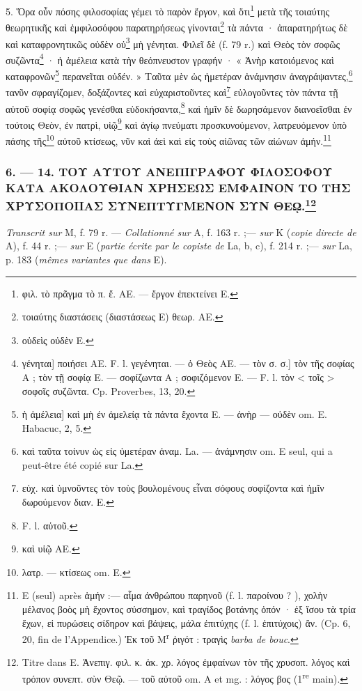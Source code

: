 \documentclass[a4paper, 11pt, oneside, polutonikogreek, french]{article}
\begin{document}
5. Ὅρα οὖν πόσης φιλοσοφίας γέμει τὸ παρὸν ἔργον, καὶ ὅτι\footnote{φιλ. τὸ πρᾶγμα τὸ π. ἔ. AE. --- ἔργον ἐπεκτείνει E.} μετὰ τῆς τοιαύτης θεωρητικῆς καὶ ἐμφιλοσόφου παρατηρήσεως γίνονται\footnote{τοιαύτης διαστάσεις (διαστάσεως E) θεωρ. AE.} τὰ πάντα · ἀπαρατηρήτως δὲ καὶ καταφρονητικῶς οὐδὲν οὐ\footnote{οὐδεὶς οὐδὲν E.} μὴ γένηται. Φιλεῖ δὲ (f. 79 r.) καὶ Θεὸς τὸν σοφῶς συζῶντα\footnote{γένηται] ποιήσει AE. F. l. γεγένηται. --- ὁ Θεὸς AE. --- τὸν σ. σ.] τὸν τῆς σοφίας A ; τὸν τῇ σοφίᾳ E. --- σοφίζωντα A ; σοφιζόμενον E. --- F. l. τὸν < τοῖς > σοφοῖς συζῶντα. Cp. Proverbes, 13, 20.} · ἡ ἀμέλεια κατὰ τὴν θεόπνευστον γραφήν · « Ἀνὴρ κατοιόμενος καὶ καταφρονῶν\footnote{ἡ ἀμέλεια] καὶ μὴ ἐν ἀμελείᾳ τὰ πάντα ἔχοντα E. --- ἀνὴρ --- οὐδὲν om. E. Habacuc, 2, 5.} περανεῖται οὐδέν. » Ταῦτα μὲν ὡς ἡμετέραν ἀνάμνησιν ἀναγράψαντες,\footnote{καὶ ταῦτα τοίνυν ὡς εἰς ὑμετέραν ἀναμ. La. --- ἀνάμνησιν om. E seul, qui a peut-être été copié sur La.} τανῦν σφραγίζομεν, δοξάζοντες καὶ εὐχαριστοῦντες καὶ\footnote{εὐχ. καὶ ὑμνοῦντες τὸν τοὺς βουλομένους εἶναι σόφους σοφίζοντα καὶ ἡμῖν δωρούμενον διαν. E.} εὐλογοῦντες τὸν πάντα τῇ αὐτοῦ σοφίᾳ σοφῶς γενέσθαι εὐδοκήσαντα,\footnote{F. l. αὑτοῦ.} καὶ ἡμῖν δὲ δωρησάμενον διανοεῖσθαι ἐν τούτοις Θεὸν, ἐν πατρὶ, υἱῷ\footnote{καὶ υἱῷ AE.} καὶ ἁγίῳ πνεύματι προσκυνούμενον, λατρευόμενον ὑπὸ πάσης τῆς\footnote{λατρ. --- κτίσεως om. E.} αὐτοῦ κτίσεως, νῦν καὶ ἀεὶ καὶ εἰς τοὺς αἰῶνας τῶν αἰώνων ἀμήν.\footnote{E (seul) après ἀμήν :--- αἷμα ἀνθρώπου παρηνοῦ (f. l. παροίνου ? ), χολὴν μέλανος βοὸς μὴ ἔχοντος σύσσημον, καὶ τραγίδος βοτάνης ὀπόν · ἐξ ἴσου τὰ τρία ἔχων, εἰ πυρώσεις σίδηρον καὶ βάψεις, μάλα ἐπιτύχης (f. l. ἐπιτύχοις) ἂν. (Cp. 6, 20, fin de l'Appendice.) Ἐκ τοῦ M\textsuperscript{r} ῥιγότ : τραγὶς \emph{barba de bouc}.}

\bigskip
\centerline{\EightStarTaper}
\centerline{\EightStarTaper\EightStarTaper}
\bigskip

\subsubsection[6. --- 14. ΤΟΥ ΑΥΤΟΥ ΑΝΕΠΙΓΡΑΦΟΥ ΦΙΛΟΣΟΦΟΥ ΚΑΤΑ ΑΚΟΛΟΥΘΙΑΝ ΧΡΗΣΕΩΣ ΕΜΦΑΙΝΟΝ ΤΟ ΤΗΣ ΧΡΥΣΟΠΟΙΙΑΣ ΣΥΝΕΠΤΥΓΜΕΝΟΝ ΣΥΝ ΘΕῼ.]{6. --- 14. ΤΟΥ ΑΥΤΟΥ ΑΝΕΠΙΓΡΑΦΟΥ ΦΙΛΟΣΟΦΟΥ ΚΑΤΑ ΑΚΟΛΟΥΘΙΑΝ ΧΡΗΣΕΩΣ ΕΜΦΑΙΝΟΝ ΤΟ ΤΗΣ ΧΡΥΣΟΠΟΙΙΑΣ ΣΥΝΕΠΤΥΓΜΕΝΟΝ ΣΥΝ ΘΕῼ.\footnote{Titre dans E. Ἀνεπιγ. φιλ. κ. ἀκ. χρ. λόγος ἐμφαίνων τὸν τῆς χρυσοπ. λόγος καὶ τρόπον συνεπτ. σὺν Θεῷ. --- τοῦ αὐτοῦ om. A et mg. : λόγος βος (1\textsuperscript{re} main).}}

\emph{Transcrit sur} M, f. 79 r. --- \emph{Collationné sur} A, f. 163 r. ;--- \emph{sur} K (\emph{copie directe de} A), f. 44 r. ;--- \emph{sur} E (\emph{partie écrite par le copiste de} La, b, c), f. 214 r. ;--- \emph{sur} La, p. 183 (\emph{mêmes variantes que dans} E).
\end{document}
